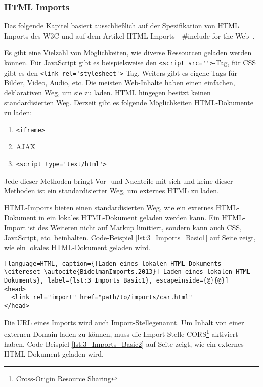 \subsubsection{HTML Imports}
\label{sec:3_WC_Imports}

Das folgende Kapitel basiert ausschließlich auf der Spezifikation von HTML Imports des W3C \citereset \autocite[siehe][]{GlazkovMorrita.2013} und auf dem Artikel \glqq HTML Imports - \#include for the Web\grqq\ \citereset \autocite[siehe][]{BidelmanImports.2013}.

Es gibt eine Vielzahl von Möglichkeiten, wie diverse Ressourcen geladen werden können. Für JavaScript gibt es beispielsweise den \lstinline|<script src=''>|-Tag, für CSS gibt es den \lstinline|<link rel='stylesheet'>|-Tag. Weiters gibt es eigene Tags für Bilder, Video, Audio, etc. Die meisten Web-Inhalte haben einen einfachen, deklarativen Weg, um sie zu laden. HTML hingegen besitzt keinen standardisierten Weg. Derzeit gibt es folgende Möglichkeiten HTML-Dokumente zu laden:
\begin{enumerate}
\item \lstinline|<iframe>|
\item AJAX
\item \lstinline|<script type='text/html'>|
\end{enumerate}

Jede dieser Methoden bringt Vor- und Nachteile mit sich und keine dieser Methoden ist ein standardisierter Weg, um externes HTML zu laden.

HTML-Imports bieten einen standardisierten Weg, wie ein externes HTML-Dokument in ein lokales HTML-Dokument geladen werden kann. Ein HTML-Import ist des Weiteren nicht auf Markup limitiert, sondern kann auch CSS, JavaScript, etc. beinhalten. Code-Beispiel \ref{lst:3_Imports_Basic1} auf Seite \pageref{lst:3_Imports_Basic1} zeigt, wie ein lokales HTML-Dokument geladen wird.

\begin{lstlisting}[language=HTML, caption={[Laden eines lokalen HTML-Dokuments \citereset \autocite{BidelmanImports.2013}] Laden eines lokalen HTML-Dokuments}, label={lst:3_Imports_Basic1}, escapeinside={@}{@}]
<head>
  <link rel="import" href="path/to/imports/car.html"
</head>
\end{lstlisting}

Die URL eines Imports wird auch \glqq Import-Stelle\grqq genannt. Um Inhalt von einer externen Domain laden zu können, muss die Import-Stelle CORS\footnote{Cross-Origin Resource Sharing} aktiviert haben. Code-Beispiel \ref{lst:3_Imports_Basic2} auf Seite \pageref{lst:3_Imports_Basic2} zeigt, wie ein externes HTML-Dokument geladen wird.

